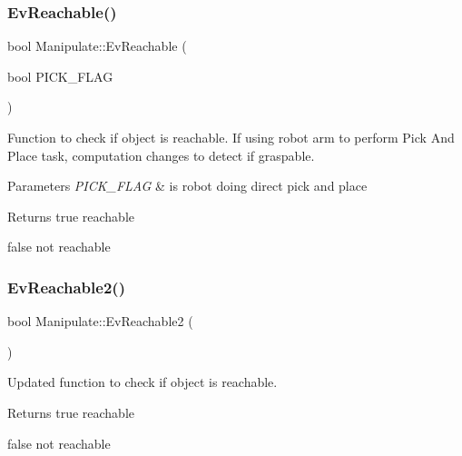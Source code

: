 \subsubsection{\texorpdfstring{Ev\+Reachable()}{EvReachable()}}
{\footnotesize\ttfamily bool Manipulate\+::\+Ev\+Reachable (\begin{DoxyParamCaption}\item[{bool}]{P\+I\+C\+K\+\_\+\+F\+L\+AG }\end{DoxyParamCaption})\hspace{0.3cm}{\ttfamily [private]}}



Function to check if object is reachable. If using robot arm to perform Pick And Place task, computation changes to detect if graspable. 


\begin{DoxyParams}{Parameters}
{\em P\+I\+C\+K\+\_\+\+F\+L\+AG} & is robot doing direct pick and place \\
\hline
\end{DoxyParams}
\begin{DoxyReturn}{Returns}
true reachable 

false not reachable 
\end{DoxyReturn}
\mbox{\label{structManipulate_ad31d1bed54184f5eb6caebc909390272}} 
\subsubsection{\texorpdfstring{Ev\+Reachable2()}{EvReachable2()}}
{\footnotesize\ttfamily bool Manipulate\+::\+Ev\+Reachable2 (\begin{DoxyParamCaption}{ }\end{DoxyParamCaption})\hspace{0.3cm}{\ttfamily [private]}}



Updated function to check if object is reachable. 

\begin{DoxyReturn}{Returns}
true reachable 

false not reachable 
\end{DoxyReturn}
\mbox{\label{structManipulate_a43cab2081e19d5502c1cfc4265a7c9fc}} 
